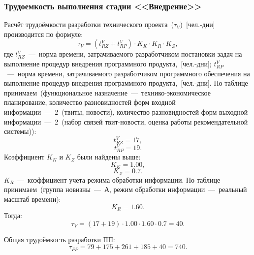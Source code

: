         \subsubsection{Трудоемкость выполнения стадии <<Внедрение>>}
            Расчёт трудоёмкости разработки технического проекта~($\tau_{V}$)~[чел.-дни] производится по формуле:
            \begin{equation}
                \tau_{V} = (t^V_{RZ} + t^V_{RP}) \cdot K_K \cdot K_R \cdot K_Z,
            \end{equation}
            где $t^V_{RZ}$~---~норма времени, затрачиваемого разработчиком постановки задач на выполнение процедур внедрения программного продукта,~[чел.-дни];
            $t^V_{RP}$~---~норма времени, затрачиваемого разработчиком программного обеспечения на выполнение процедур внедрения программного продукта,~[чел.-дни].
            По таблице принимаем~(функциональное назначение~---~технико-экономическое планирование,
            количество разновидностей форм входной информации~---~2~(твиты, новости),
            количество разновидностей форм выходной информации~---~2~(набор связей твит-новости, оценка работы рекомендательной системы)):
            \begin{equation*}
                t^V_{RZ} = 17,
            \end{equation*}
            \begin{equation*}
                t^V_{RP} = 19.
            \end{equation*}
            Коэффициент $K_K$ и $K_Z$ были найдены выше:
            \begin{equation*}
                K_K=1.00,
            \end{equation*}
            \begin{equation*}
                K_Z=0.7.
            \end{equation*}
            $K_R$~---~коэффициент учета режима обработки информации. По таблице принимаем~(группа новизны~---~А, режим обработки информации~---~реальный масштаб времени):
            \begin{equation*}
                K_R = 1.60.
            \end{equation*}
            Тогда:
            \begin{equation*}
                \tau_{V} = (17+19) \cdot 1.00 \cdot 1.60 \cdot 0.7= 40.
            \end{equation*}

        Общая трудоёмкость разработки ПП:
        \begin{equation*}
            \tau_{PP} = 79+175+261+185+40= 740.
        \end{equation*}

